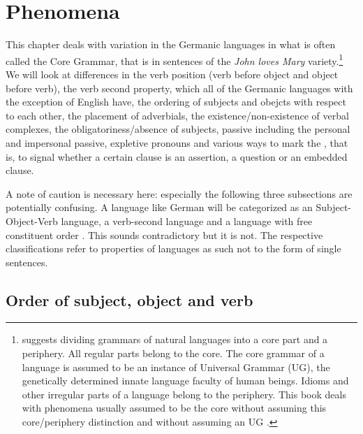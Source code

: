 
\settowidth{}


\chapter{Phenomena}


This chapter deals with variation in the Germanic languages in what is often called the Core
Grammar, that is in sentences of the \emph{John loves Mary} variety.\footnote{%
  \citet[--8]{Chomsky81a} suggests dividing grammars of natural languages into a core part and a periphery.
All regular parts belong to the core. The core grammar of a language is assumed to be an instance of
Universal Grammar (UG), the genetically determined innate language faculty of human beings. Idioms
and other irregular parts of a language belong to the periphery. This book deals with phenomena
usually assumed to be the core without assuming this core/periphery distinction and without assuming
an UG \citep{MuellerKernigkeit,MuellerCoreGram}.
} We will look at differences in
the verb position (verb before object and object before verb), the verb second property, which
all of the Germanic languages with the exception of English have, the ordering of subjects and
obejcts with respect to each other, the placement of adverbials, the existence/non-existence of
verbal complexes, the obligatoriness/absence of subjects, passive including the personal and
impersonal passive, expletive pronouns and various ways to mark the , that is, to signal
whether a certain clause is an assertion, a question or an embedded clause.

A note of caution is necessary here: especially the following three subsections are potentially
confusing. A language like German will be categorized as an Subject-Object-Verb language, a verb-second language and
a language with free constituent order \citep{Haftka96a}. This sounds contradictory but it is not. The respective
classifications refer to properties of languages as such not to the form of single sentences.

\section{Order of subject, object and verb}
\label{sec-intro-svo}

